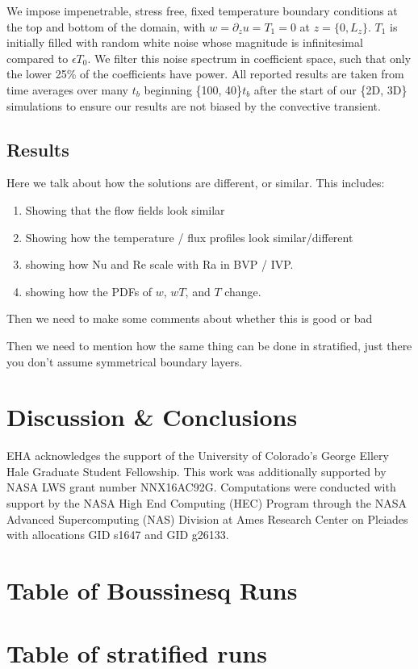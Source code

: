\documentclass[aps, pre, onecolumn, nofootinbib, notitlepage, groupedaddress, amsfonts, amssymb, amsmath, longbibliography]{revtex4-1}
\begin{document}
We impose impenetrable, stress free, fixed temperature boundary conditions at
the top and bottom of the domain, with 
$w = \partial_z u = T_1 = 0$ at $z = \{0, L_z\}$. 
$T_1$ is initially filled with
random white noise whose magnitude is infinitesimal
compared to $\epsilon T_0$.
We filter this noise spectrum in coefficient space, 
such that only the lower 25\% of the coefficients
have power. All reported results are taken from time averages
over many $t_b$ beginning \{100, 40\}$t_b$
after the start of our \{2D, 3D\} simulations to
ensure our results are not biased by the convective transient.



\subsection{Results}
Here we talk about how the solutions are different, or similar.  This includes:
\begin{enumerate}
\item Showing that the flow fields look similar
\item Showing how the temperature / flux profiles look similar/different
\item showing how Nu and Re scale with Ra in BVP / IVP.
\item showing how the PDFs of $w$, $wT$, and $T$ change.
\end{enumerate}

Then we need to make some comments about whether this is good or bad

Then we need to mention how the same thing can be done in stratified, just there you don't
assume symmetrical boundary layers.





\section{Discussion \& Conclusions}
\label{sec:results}




\begin{acknowledgments}
EHA acknowledges the support of the University of Colorado's George 
Ellery Hale Graduate Student Fellowship.
This work was additionally supported by  NASA LWS grant number NNX16AC92G.  
Computations were conducted 
with support by the NASA High End Computing (HEC) Program through the NASA 
Advanced Supercomputing (NAS) Division at Ames Research Center on Pleiades
with allocations GID s1647 and GID g26133.
\end{acknowledgments}


\appendix
\section{Table of Boussinesq Runs}



\section{Table of stratified runs}



\end{document}

